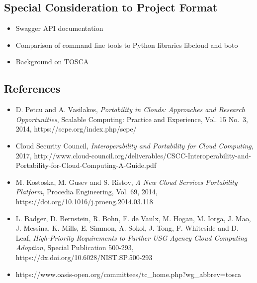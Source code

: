 \hypertarget{special-consideration-to-project-format}{%
\subsection{Special Consideration to Project
Format}\label{special-consideration-to-project-format}}

\begin{itemize}
\item
  Swagger API documentation
\item
  Comparison of command line tools to Python libraries libcloud and boto
\item
  Background on TOSCA
\end{itemize}

\subsection{References}\label{references}

\begin{itemize}
\item
  D. Petcu and A. Vasilakos, \emph{Portability in Clouds: Approaches and
  Research Opportunities}, Scalable Computing: Practice and Experience,
  Vol. 15 No.~3, 2014, https://scpe.org/index.php/scpe/
\item
  Cloud Security Council, \emph{Interoperability and Portability for
  Cloud Computing}, 2017,
  http://www.cloud-council.org/deliverables/CSCC-Interoperability-and-Portability-for-Cloud-Computing-A-Guide.pdf
\item
  M. Kostoska, M. Gusev and S. Ristov, \emph{A New Cloud Services
  Portability Platform}, Procedia Engineering, Vol. 69, 2014,
  https://doi.org/10.1016/j.proeng.2014.03.118
\item
  L. Badger, D. Bernstein, R. Bohn, F. de Vaulx, M. Hogan, M. Iorga, J.
  Mao, J. Messina, K. Mills, E. Simmon, A. Sokol, J. Tong, F. Whiteside
  and D. Leaf, \emph{High-Priority Requirements to Further USG Agency
  Cloud Computing Adoption}, Special Publication 500-293,
  https://dx.doi.org/10.6028/NIST.SP.500-293
\item
  https://www.oasis-open.org/committees/tc\_home.php?wg\_abbrev=tosca
\end{itemize}
